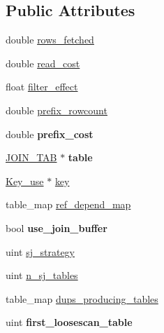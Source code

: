 \subsection*{Public Attributes}
\begin{DoxyCompactItemize}
\item 
double \mbox{\hyperlink{structst__position_aa38b3dcf630fb252f9eae43cb1d8a847}{rows\+\_\+fetched}}
\item 
double \mbox{\hyperlink{structst__position_a455bdd05662b3e0e7670501bf0788cdd}{read\+\_\+cost}}
\item 
float \mbox{\hyperlink{structst__position_af2d5d5e5b65710d3a1a1ae38b14f44de}{filter\+\_\+effect}}
\item 
double \mbox{\hyperlink{structst__position_aa29ae7911f9cc07153c57c5bc9ff9617}{prefix\+\_\+rowcount}}
\item 
\mbox{\label{structst__position_af0c9d2de2a7041516158ed42a97ce35b}} 
double {\bfseries prefix\+\_\+cost}
\item 
\mbox{\label{structst__position_a47b8a06d0137c8109d4798f9f4ecdc78}} 
\mbox{\hyperlink{classJOIN__TAB}{J\+O\+I\+N\+\_\+\+T\+AB}} $\ast$ {\bfseries table}
\item 
\mbox{\hyperlink{classKey__use}{Key\+\_\+use}} $\ast$ \mbox{\hyperlink{structst__position_a5d8ce81ce1aaae66efabc4bef2f53f4e}{key}}
\item 
table\+\_\+map \mbox{\hyperlink{structst__position_a0adedeafc969f1754149c722665d64c0}{ref\+\_\+depend\+\_\+map}}
\item 
\mbox{\label{structst__position_a6f00683cab5fe2cfd4aaa45a2a5a7710}} 
bool {\bfseries use\+\_\+join\+\_\+buffer}
\item 
uint \mbox{\hyperlink{structst__position_ab27ba77e3972eeb713a371d38657ce1f}{sj\+\_\+strategy}}
\item 
uint \mbox{\hyperlink{structst__position_afa9fd7ef4d5fb77a167a68bd46f7b159}{n\+\_\+sj\+\_\+tables}}
\item 
table\+\_\+map \mbox{\hyperlink{structst__position_a1dd4650de7dfd57c330261f9a0b583fe}{dups\+\_\+producing\+\_\+tables}}
\item 
\mbox{\label{structst__position_ad75bf24712a71313fdf9e130b8bce644}} 
uint {\bfseries first\+\_\+loosescan\+\_\+table}
\item 

\end{DoxyCompactItemize}
